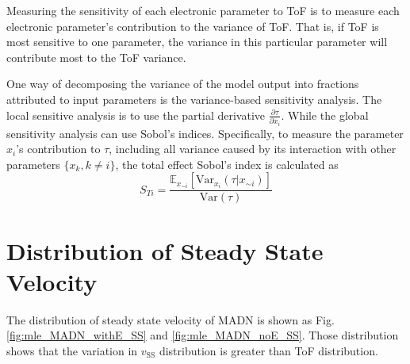 \documentclass[letterpaper,12pt]{article}
\begin{document}
Measuring the sensitivity of each electronic parameter to ToF is to measure each electronic parameter's contribution to the variance of ToF. 
That is, if ToF is most sensitive to one parameter, the variance in this particular parameter will contribute most to the ToF variance. 

One way of decomposing the variance of the model output into fractions attributed to input parameters is the variance-based sensitivity analysis. The local sensitive analysis is to use the partial derivative $\frac{\partial \tau}{\partial x_i}$. While the global sensitivity analysis can use Sobol's indices. Specifically, to measure the parameter $x_i$'s contribution to $\tau$, including all variance caused by its interaction with other parameters $\{x_k, k \neq i \}$, the total effect Sobol's index is calculated as 
\begin{equation}
    S_{Ti} = \frac{ \mathbb{E}_{x_{\sim i}}[ \text{Var}_{x_i}(\tau|x_{\sim i}) ] }{ \text{Var}(\tau) }
    \label{eq:STi}
\end{equation}



\section{Distribution of Steady State Velocity}
The distribution of steady state velocity of MADN is shown as Fig.\ref{fig:mle_MADN_withE_SS} and \ref{fig:mle_MADN_noE_SS}. 
Those distribution shows that the variation in $v_\text{SS}$ distribution is greater than ToF distribution. 
\end{document}
